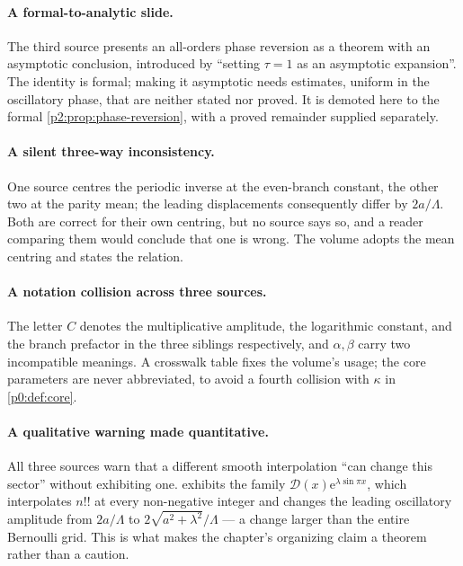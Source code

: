 \documentclass[11pt,a4paper,oneside]{book}
\theoremstyle{plain}
\theoremstyle{definition}
\theoremstyle{remark}
\newcommand{\e}{\mathrm{e}}
\begin{document}
\paragraph{A formal-to-analytic slide.}
The third source presents an all-orders phase reversion as a theorem with an
asymptotic conclusion, introduced by ``setting \(\tau=1\) as an asymptotic
expansion''.  The identity is formal; making it asymptotic needs estimates,
uniform in the oscillatory phase, that are neither stated nor proved.  It is
demoted here to the formal \cref{p2:prop:phase-reversion}, with a proved
remainder supplied separately.

\paragraph{A silent three-way inconsistency.}
One source centres the periodic inverse at the even-branch constant, the other
two at the parity mean; the leading displacements consequently differ by
\(2a/\Lambda\).  Both are correct for their own centring, but no source says
so, and a reader comparing them would conclude that one is wrong.  The volume
adopts the mean centring and states the relation.

\paragraph{A notation collision across three sources.}
The letter \(C\) denotes the multiplicative amplitude, the logarithmic
constant, and the branch prefactor in the three siblings respectively, and
\(\alpha,\beta\) carry two incompatible meanings.  A crosswalk table fixes the
volume's usage; the core parameters are never abbreviated, to avoid a fourth
collision with \(\kappa\) in \cref{p0:def:core}.

\paragraph{A qualitative warning made quantitative.}
All three sources warn that a different smooth interpolation ``can change this
sector'' without exhibiting one.   exhibits the
family \(\mathcal D(x)\e^{\lambda\sin\pi x}\), which interpolates \(n!!\) at
every non-negative integer and changes the leading oscillatory amplitude from
\(2a/\Lambda\) to \(2\sqrt{a^2+\lambda^2}/\Lambda\) --- a change larger than
the entire Bernoulli grid.  This is what makes the chapter's organizing claim
a theorem rather than a caution.
\end{document}
